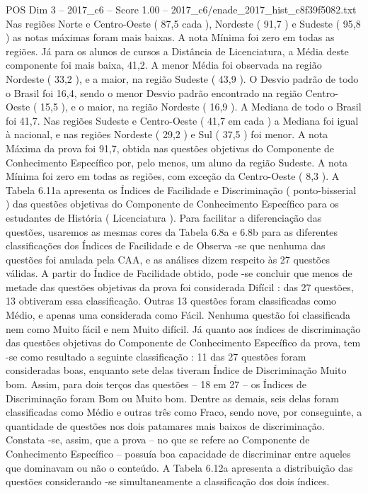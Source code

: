 \begin{textsample}{POS Dim 3 – 2017\_c6 – Score 1.00 – 2017\_c6/enade\_2017\_hist\_c8f39f5082.txt}
Nas regiões Norte e Centro-Oeste ( 87,5 cada ), Nordeste ( 91,7 ) e Sudeste ( 95,8 ) as notas máximas foram mais baixas.
A nota Mínima foi zero em todas as regiões.
Já para os alunos de cursos a Distância de Licenciatura, a Média deste componente foi mais baixa, 41,2.
A menor Média foi observada na região Nordeste ( 33,2 ), e a maior, na região Sudeste ( 43,9 ).
O Desvio padrão de todo o Brasil foi 16,4, sendo o menor Desvio padrão encontrado na região Centro-Oeste ( 15,5 ), e o maior, na região Nordeste ( 16,9 ).
A Mediana de todo o Brasil foi 41,7.
Nas regiões Sudeste e Centro-Oeste ( 41,7 em cada ) a Mediana foi igual à nacional, e nas regiões Nordeste ( 29,2 ) e Sul ( 37,5 ) foi menor.
A nota Máxima da prova foi 91,7, obtida nas questões objetivas do Componente de Conhecimento Específico por, pelo menos, um aluno da região Sudeste.
A nota Mínima foi zero em todas as regiões, com exceção da Centro-Oeste ( 8,3 ).
A Tabela 6.11a apresenta os Índices de Facilidade e Discriminação ( ponto-bisserial ) das questões objetivas do Componente de Conhecimento Específico para os estudantes de História ( Licenciatura ).
Para facilitar a diferenciação das questões, usaremos as mesmas cores da Tabela 6.8a e 6.8b para as diferentes classificações dos Índices de Facilidade e de Observa -se que nenhuma das questões foi anulada pela CAA, e as análises dizem respeito às 27 questões válidas.
A partir do Índice de Facilidade obtido, pode -se concluir que menos de metade das questões objetivas da prova foi considerada Difícil : das 27 questões, 13 obtiveram essa classificação.
Outras 13 questões foram classificadas como Médio, e apenas uma considerada como Fácil.
Nenhuma questão foi classificada nem como Muito fácil e nem Muito difícil.
Já quanto aos índices de discriminação das questões objetivas do Componente de Conhecimento Específico da prova, tem -se como resultado a seguinte classificação : 11 das 27 questões foram consideradas boas, enquanto sete delas tiveram Índice de Discriminação Muito bom.
Assim, para dois terços das questões – 18 em 27 – os Índices de Discriminação foram Bom ou Muito bom.
Dentre as demais, seis delas foram classificadas como Médio e outras três como Fraco, sendo nove, por conseguinte, a quantidade de questões nos dois patamares mais baixos de discriminação.
Constata -se, assim, que a prova – no que se refere ao Componente de Conhecimento Específico – possuía boa capacidade de discriminar entre aqueles que dominavam ou não o conteúdo.
A Tabela 6.12a apresenta a distribuição das questões considerando -se simultaneamente a classificação dos dois índices.

\end{textsample}

